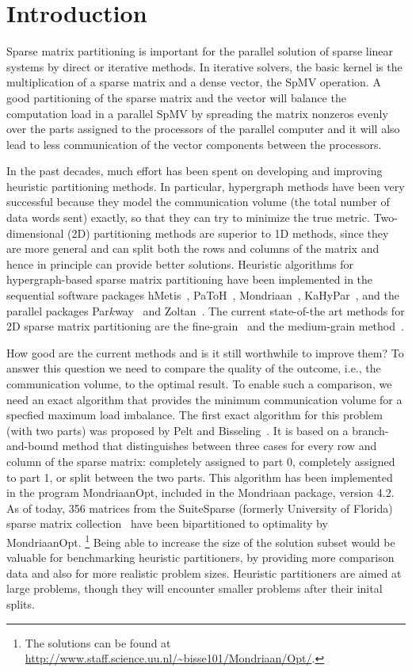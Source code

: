 \section{Introduction}
\label{sec:intro}
Sparse matrix partitioning is important for the parallel solution of sparse linear systems
by direct or iterative methods. In iterative solvers, the basic kernel is the multiplication
of a sparse matrix and a dense vector, the SpMV operation. A good partitioning of the sparse matrix
and the vector will balance the computation load in a parallel SpMV by spreading the
matrix nonzeros evenly over the parts assigned to the processors 
of the parallel computer and it will also
lead to less communication of the vector components between the processors.

In the past decades, much effort has been spent on developing and improving
heuristic partitioning methods. In particular, hypergraph methods have been very
successful because they model the communication volume (the total
number of data words sent) exactly, so that they can try to minimize the true metric.
Two-dimensional (2D) partitioning methods are superior to 1D methods,
since they are more general and can split both the rows and columns of the matrix and
hence in principle can provide better solutions.
Heuristic algorithms for hypergraph-based sparse matrix partitioning
have been implemented in the sequential software packages hMetis~\cite{karypis99b},
PaToH~\cite{catalyurek99}, Mondriaan~\cite{vastenhouw05}, KaHyPar~\cite{akhremtsev17},
and the parallel packages Par$k$way~\cite{trifunovic08} and Zoltan~\cite{devine06}.
The current state-of-the art methods for 2D sparse matrix partitioning are the fine-grain~\cite{catalyurek01}
and the medium-grain method~\cite{pelt14}. 

How good are the current methods and is it still worthwhile to improve them?
To answer this question we need to compare the quality of the outcome,
i.e., the communication volume, to the optimal result.
To enable such a comparison, we need an exact algorithm that provides the 
minimum communication volume for a specfied maximum load imbalance.
The first exact algorithm for this problem (with two parts)
was proposed by Pelt and Bisseling~\cite{pelt15}.
It is based on a branch-and-bound method that distinguishes  between
three cases for every row and column of the sparse matrix:
completely assigned to part 0, completely assigned to part 1, 
or split between the two parts. This algorithm has been implemented
in the program MondriaanOpt, included in the Mondriaan package,
version 4.2. As of today, 356 matrices from the SuiteSparse 
(formerly University of Florida) sparse matrix collection~\cite{davis11}
have been bipartitioned to optimality by MondriaanOpt. 
\footnote{The solutions can be found at
\url{http://www.staff.science.uu.nl/~bisse101/Mondriaan/Opt/}.}
Being able to increase the size of the solution subset would be valuable
for benchmarking heuristic partitioners, by providing more comparison data and also  
for more realistic problem sizes. Heuristic partitioners are aimed at large 
problems, though they will encounter smaller problems after their inital splits.

